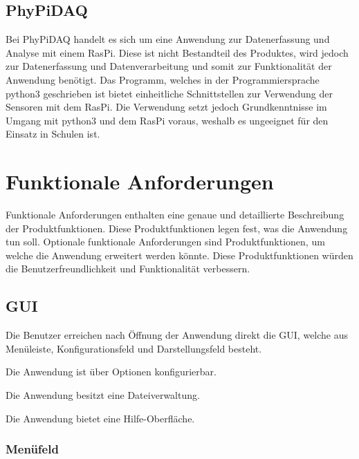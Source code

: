 \documentclass[parskip=full]{scrartcl}
\begin{document}
\subsection{PhyPiDAQ}

Bei PhyPiDAQ handelt es sich um eine Anwendung zur Datenerfassung und Analyse mit einem \gls{RasPi}. Diese ist nicht Bestandteil des Produktes, wird jedoch zur Datenerfassung und Datenverarbeitung und somit zur Funktionalität der Anwendung  benötigt. Das Programm, welches in der Programmiersprache \gls{python3} geschrieben ist bietet einheitliche Schnittstellen zur Verwendung der Sensoren mit dem \gls{RasPi}. Die Verwendung setzt jedoch Grundkenntnisse im Umgang mit \gls{python3} und dem \gls{RasPi} voraus, weshalb es ungeeignet für den Einsatz in Schulen ist.

\clearpage
\section{Funktionale Anforderungen}\label{funktionale}

Funktionale Anforderungen enthalten eine genaue und detaillierte Beschreibung der Produktfunktionen. Diese Produktfunktionen legen fest, was die Anwendung tun soll. Optionale funktionale Anforderungen sind Produktfunktionen, um welche die Anwendung erweitert werden könnte. Diese Produktfunktionen würden die Benutzerfreundlichkeit und Funktionalität verbessern.


\subsection{GUI} %

\begin{description}
\hypertarget{link-f010}{\item[F010]} Die Benutzer erreichen nach Öffnung der Anwendung direkt die \gls{GUI}, welche aus Menüleiste, Konfigurationsfeld und Darstellungsfeld besteht.
\hypertarget{link-f020}{\item[F020]} Die Anwendung ist über Optionen konfigurierbar. 
\hypertarget{link-f030}{\item[F030]} Die Anwendung besitzt eine Dateiverwaltung.
\hypertarget{link-f040}{\item[F040]} Die Anwendung bietet eine Hilfe-Oberfläche.
\end{description}

\subsubsection{Menüfeld}
\end{document}
